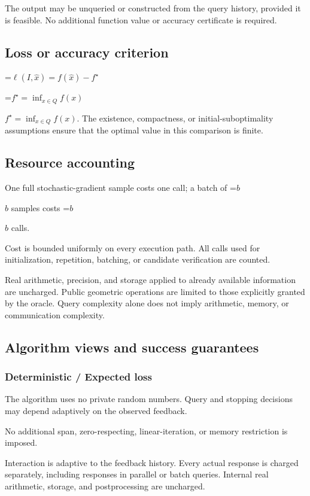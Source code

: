 \documentclass[10pt,a4paper]{article}
\newcommand{\AtlasMath}[1]{\par\begingroup\centering\setbox0=\hbox{$\displaystyle #1$}\ifdim\wd0>1.4\linewidth\typeout{ATLAS WIDE FORMULA: \the\wd0}\fi\ifdim\wd0>\linewidth\resizebox{\linewidth}{!}{\box0}\else\box0\fi\par\endgroup}
\newcommand{\AtlasInlineMath}[1]{\begingroup\setbox0=\hbox{$#1$}\ifdim\wd0>.4\linewidth\endgroup\AtlasMath{#1}\else\endgroup$#1$\fi}
\begin{document}
The output may be unqueried or constructed from the query history, provided it is feasible. No additional function value or accuracy certificate is required.

\subsection{Loss or accuracy criterion}

\AtlasMath{\ell(I,\widehat{x})=f(\widehat{x})-f^\star}


\AtlasInlineMath{f^\star=\inf_{x\in Q}f(x)}. The existence, compactness, or initial-suboptimality assumptions ensure that the optimal value in this comparison is finite.

\subsection{Resource accounting}
One full stochastic-gradient sample costs one call; a batch of \AtlasInlineMath{b} samples costs \AtlasInlineMath{b} calls.

Cost is bounded uniformly on every execution path. All calls used for initialization, repetition, batching, or candidate verification are counted.

Real arithmetic, precision, and storage applied to already available information are uncharged. Public geometric operations are limited to those explicitly granted by the oracle. Query complexity alone does not imply arithmetic, memory, or communication complexity.

\subsection{Algorithm views and success guarantees}
\subsubsection{Deterministic / Expected loss}
The algorithm uses no private random numbers. Query and stopping decisions may depend adaptively on the observed feedback.

No additional span, zero-respecting, linear-iteration, or memory restriction is imposed.

Interaction is adaptive to the feedback history. Every actual response is charged separately, including responses in parallel or batch queries. Internal real arithmetic, storage, and postprocessing are uncharged.
\end{document}
